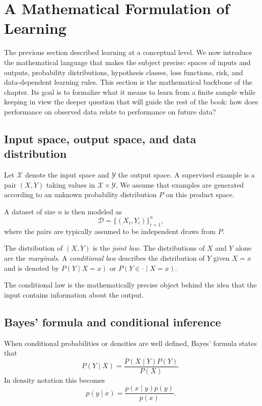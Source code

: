 \section{A Mathematical Formulation of Learning}

The previous section described learning at a conceptual level. We now introduce the mathematical language that makes the subject precise: spaces of inputs and outputs, probability distributions, hypothesis classes, loss functions, risk, and data-dependent learning rules. This section is the mathematical backbone of the chapter. Its goal is to formalize what it means to learn from a finite sample while keeping in view the deeper question that will guide the rest of the book: how does performance on observed data relate to performance on future data?

\subsection*{Input space, output space, and data distribution}

Let $\mathcal X$ denote the input space and $\mathcal Y$ the output space. A supervised example is a pair $(X,Y)$ taking values in $\mathcal X\times \mathcal Y$. We assume that examples are generated according to an unknown probability distribution $P$ on this product space.

A dataset of size $n$ is then modeled as
\[
\mathcal D = \{(X_i,Y_i)\}_{i=1}^n,
\]
where the pairs are typically assumed to be independent draws from $P$.

\begin{definition}
The distribution of $(X,Y)$ is the \emph{joint law}. The distributions of $X$ and $Y$ alone are the \emph{marginals}. A \emph{conditional law} describes the distribution of $Y$ given $X=x$ and is denoted by $P(Y\mid X=x)$ or $P(Y\in\cdot\mid X=x)$.
\end{definition}

The conditional law is the mathematically precise object behind the idea that the input contains information about the output.

\subsection*{Bayes' formula and conditional inference}

When conditional probabilities or densities are well defined, Bayes' formula states that
\[
P(Y\mid X)=\frac{P(X\mid Y)P(Y)}{P(X)}.
\]
In density notation this becomes
\[
p(y\mid x)=\frac{p(x\mid y)p(y)}{p(x)}.
\]

